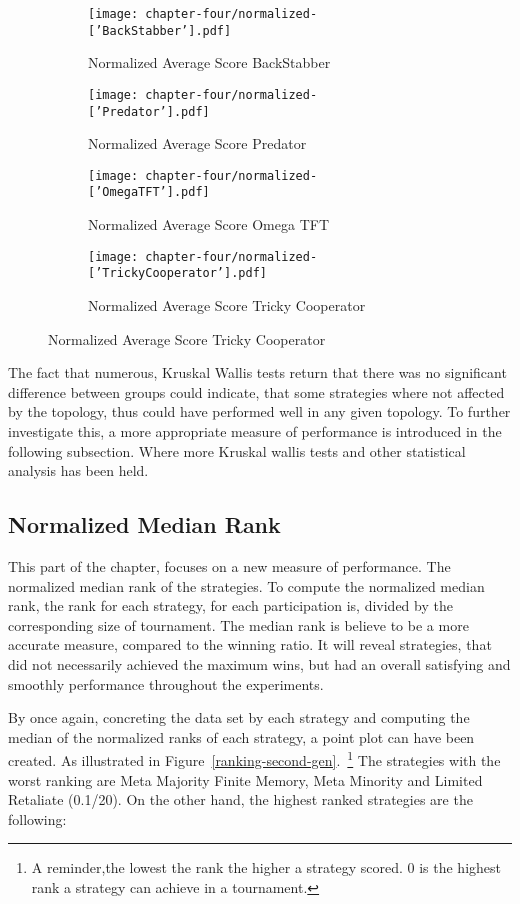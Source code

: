 \begin{figure}[!hbtp]
	\centering
	\begin{subfigure}[t]{0.70\textwidth}
		\centering
		\texttt{[image: chapter-four/normalized-['BackStabber'].pdf]}
		\caption{Normalized Average Score BackStabber}
	\end{subfigure}
	\hfill
	\begin{subfigure}[t]{0.70\textwidth}\centering
		\centering
		\texttt{[image: chapter-four/normalized-['Predator'].pdf]}
		\caption{Normalized Average Score Predator}
	\end{subfigure}
	\hfill
	\begin{subfigure}[t]{0.70\textwidth}\centering
		\centering
		\texttt{[image: chapter-four/normalized-['OmegaTFT'].pdf]}
		\caption{Normalized Average Score Omega TFT}
	\end{subfigure}
	\hfill
	\begin{subfigure}[t]{0.70\textwidth}\centering
		\centering
		\texttt{[image: chapter-four/normalized-['TrickyCooperator'].pdf]}
		\caption{Normalized Average Score Tricky Cooperator}
	\end{subfigure}
\end{figure}

The fact that numerous, Kruskal Wallis tests return that there was no significant
difference between groups could indicate, that some strategies where not affected
by the topology, thus could have performed well in any given topology.
To further investigate this, a more appropriate measure of performance is
introduced in the following subsection. Where more Kruskal wallis tests and
other statistical analysis has been held.

\subsection{Normalized Median Rank}

This part of the chapter, focuses on a new measure of performance. The
normalized median rank of the strategies. To compute the normalized median rank,
the rank for each strategy, for each participation is, divided by the corresponding
size of tournament. The median rank is believe to be a more accurate measure,
compared to the winning ratio. It will reveal strategies, that did not necessarily
achieved the maximum wins, but had an overall satisfying and smoothly
performance throughout the experiments.

By once again, concreting the data set by each strategy and computing the median
of the normalized ranks of each strategy, a point plot can have been created.
As illustrated in Figure~\ref{ranking-second-gen}.~\footnote{A reminder,the
	lowest the rank the higher a strategy scored. 0 is the highest rank a strategy
can achieve in a tournament.}
The strategies with the worst ranking are Meta Majority Finite Memory, Meta
Minority and Limited Retaliate (0.1/20). On the other hand, the highest ranked
strategies are the following:

